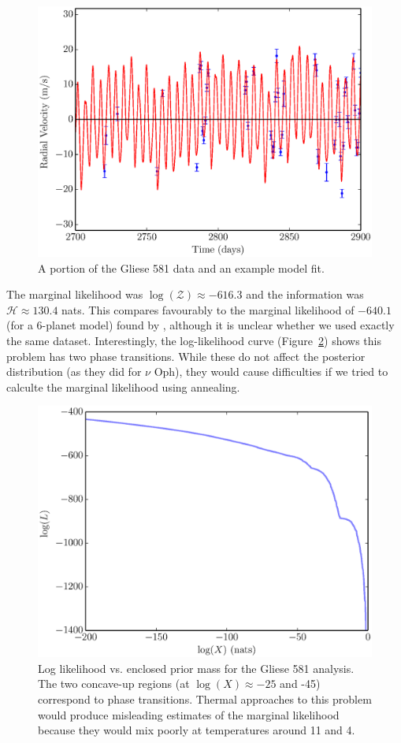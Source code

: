 \documentclass[useAMS,usenatbib]{mn2e}
\begin{document}
\begin{figure}
\includegraphics[scale=0.45]{Figures/gliese581.eps}
\caption{A portion of the Gliese 581 data and an example model fit.
\label{fig:gliese581}}
\end{figure}

The marginal likelihood was $\log(\mathcal{Z}) \approx -616.3$ and the
information was $\mathcal{H} \approx 130.4$ nats. This compares favourably
to the marginal likelihood of $-640.1$ (for a 6-planet model)
found by \citet{fengji}, although it is unclear whether we used exactly the
same dataset.
Interestingly, the log-likelihood curve (Figure~\ref{fig:logl})
shows this problem has two phase transitions. While these do not affect the
posterior distribution (as they did for $\nu$ Oph), they would cause difficulties
if we tried to calculte the marginal likelihood using annealing.

\begin{figure}
\includegraphics[scale=0.45]{Figures/logl.eps}
\caption{Log likelihood vs. enclosed prior mass for the Gliese 581 analysis.
The two concave-up regions (at $\log(X) \approx -25$ and -45) correspond to
phase transitions. Thermal approaches to this problem would produce misleading
estimates of the marginal likelihood because they would mix poorly at temperatures
around 11 and 4.
\label{fig:logl}}
\end{figure}
\end{document}
